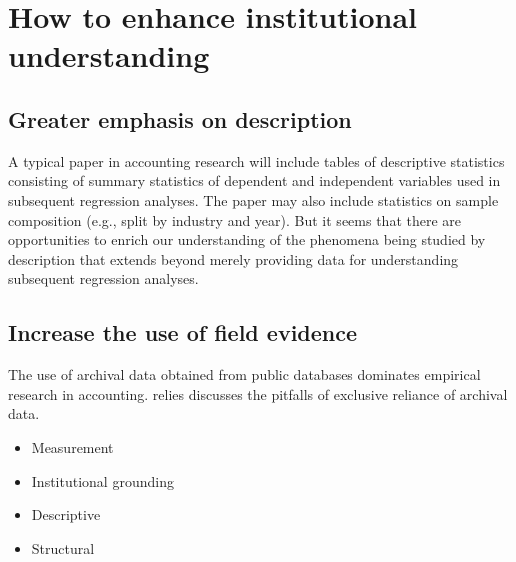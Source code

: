 \section{How to enhance institutional understanding}

\subsection{Greater emphasis on description}
A typical paper in accounting research will include tables of descriptive statistics consisting of summary statistics of dependent and independent variables used in subsequent regression analyses. The paper may also include statistics on sample composition (e.g., split by industry and year). But it seems that there are opportunities to enrich our understanding of the phenomena being studied by description that extends beyond merely providing data for understanding subsequent regression analyses.

\subsection{Increase the use of field evidence}

The use of archival data obtained from public databases dominates empirical research in accounting. relies \cite{Soltes:2014gr} discusses the pitfalls of exclusive reliance of archival data. 


\begin{itemize}
\item Measurement
\item Institutional grounding
\item Descriptive
\item Structural
\end{itemize}
